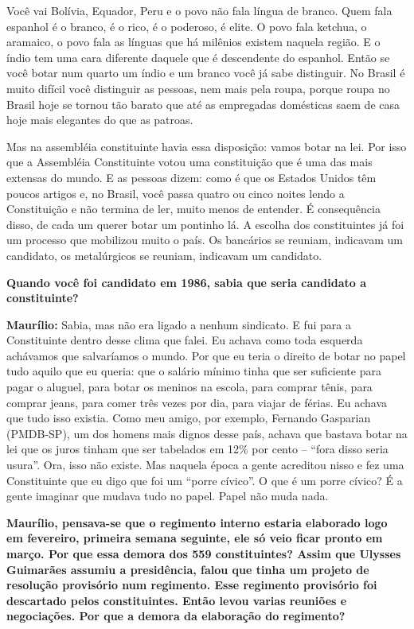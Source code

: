 Você vai Bolívia, Equador, Peru e o povo não fala língua de branco. Quem
fala espanhol é o branco, é o rico, é o poderoso, é elite. O povo fala
ketchua, o aramaico, o povo fala as línguas que há milênios existem
naquela região. E o índio tem uma cara diferente daquele que é
descendente do espanhol. Então se você botar num quarto um índio e um
branco você já sabe distinguir. No Brasil é muito difícil você
distinguir as pessoas, nem mais pela roupa, porque roupa no Brasil hoje
se tornou tão barato que até as empregadas domésticas saem de casa hoje
mais elegantes do que as patroas.

Mas na assembléia constituinte havia essa disposição: vamos botar na
lei. Por isso que a Assembléia Constituinte votou uma constituição que é
uma das mais extensas do mundo. E as pessoas dizem: como é que os
Estados Unidos têm poucos artigos e, no Brasil, você passa quatro ou
cinco noites lendo a Constituição e não termina de ler, muito menos de
entender. É consequência disso, de cada um querer botar um pontinho lá.
A escolha dos constituintes já foi um processo que mobilizou muito o
país. Os bancários se reuniam, indicavam um candidato, os metalúrgicos
se reuniam, indicavam um candidato.

\textbf{Quando você foi candidato em 1986, sabia que seria candidato a
constituinte?}

\textbf{Maurílio:} Sabia, mas não era ligado a nenhum sindicato. E fui
para a Constituinte dentro desse clima que falei. Eu achava como toda
esquerda achávamos que salvaríamos o mundo. Por que eu teria o direito
de botar no papel tudo aquilo que eu queria: que o salário mínimo tinha
que ser suficiente para pagar o aluguel, para botar os meninos na
escola, para comprar tênis, para comprar jeans, para comer três vezes
por dia, para viajar de férias. Eu achava que tudo isso existia. Como
meu amigo, por exemplo, Fernando Gasparian (PMDB-SP), um dos homens mais
dignos desse país, achava que bastava botar na lei que os juros tinham
que ser tabelados em 12\% por cento -- ``fora disso seria usura''. Ora,
isso não existe. Mas naquela época a gente acreditou nisso e fez uma
Constituinte que eu digo que foi um ``porre cívico''. O que é um porre
cívico? É a gente imaginar que mudava tudo no papel. Papel não muda
nada.

\textbf{Maurílio, pensava-se que o regimento interno estaria elaborado
logo em fevereiro, primeira semana seguinte, ele só veio ficar pronto em
março. Por que essa demora dos 559 constituintes? Assim que Ulysses
Guimarães assumiu a presidência, falou que tinha um projeto de resolução
provisório num regimento. Esse regimento provisório foi descartado pelos
constituintes. Então levou varias reuniões e negociações. Por que a
demora da elaboração do regimento?}

